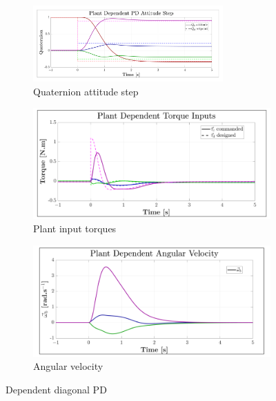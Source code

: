 \begin{figure}[htbp]
\vspace{-10pt}
\centering
\begin{subfigure}{\textwidth}
\centering
\includegraphics[width=0.8\textwidth]{graphs/PD_Diagonal_Dependent_Step}
\vspace{-6pt}
\caption{Quaternion attitude step}
\label{fig:PD_Diagonal_Dependent_Step}
\end{subfigure}
\begin{subfigure}{0.49\textwidth}
\centering
\includegraphics[width=\textwidth]{graphs/PD_Diagonal_Dependent_Torque}
\caption{Plant input torques}
\label{fig:PD_Diagonal_Dependent_Torque}
\end{subfigure}
\begin{subfigure}{0.49\textwidth}
\centering
\includegraphics[width=\textwidth]{graphs/PD_Diagonal_Dependent_Angular}
\caption{Angular velocity}
\label{fig:PD_Diagonal_Dependent_Angular}
\end{subfigure}
\vspace{-8pt}
\caption{Dependent diagonal PD}
\vspace{-18pt}
\end{figure}
